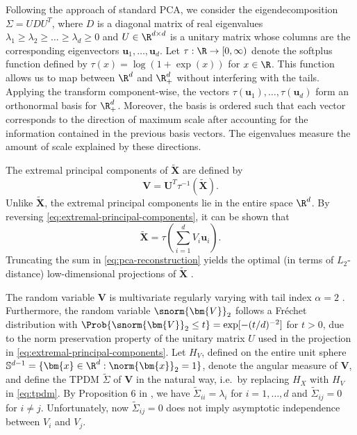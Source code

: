 \documentclass[en-GB, a4paper, nobind]{templates/bathreport}
\begin{document}
Following the approach of standard PCA, we consider the eigendecomposition \(\Sigma=UDU^T\), where \(D\) is a diagonal matrix of real eigenvalues \(\lambda_1\geq\lambda_2\geq\ldots\geq\lambda_d\geq 0\) and \(U\in\R^{d\times d}\) is a unitary matrix whose columns are the corresponding eigenvectors \(\bm{u}_1,\ldots,\bm{u}_d\). Let \(\tau:\R\to[0,\infty)\) denote the softplus function defined by \(\tau(x)=\log(1+\exp(x))\) for \(x\in\R\). This function allows us to map between \(\R^d\) and \(\R_+^d\) without interfering with the tails. Applying the transform component-wise, the vectors \(\tau(\bm{u}_1),\ldots,\tau(\bm{u}_d)\) form an orthonormal basis for \(\R_+^d\). Moreover, the basis is ordered such that each vector corresponds to the direction of maximum scale after accounting for the information contained in the previous basis vectors. The eigenvalues measure the amount of scale explained by these directions.

The extremal principal components of \(\tilde{\bm{X}}\) are defined by
\begin{equation}
\bm{V} = \bm{U}^T\tau^{-1}(\tilde{\bm{X}}).
\label{eq:extremal-principal-components}
\end{equation}
Unlike \(\tilde{\bm{X}}\), the extremal principal components lie in the entire space \(\R^d\). By reversing \eqref{eq:extremal-principal-components}, it can be shown that
\begin{equation}
\tilde{\bm{X}} = \tau\left(\sum_{i=1}^d V_{i}\bm{u}_i\right).
\label{eq:pca-reconstruction}
\end{equation}
Truncating the sum in \eqref{eq:pca-reconstruction} yields the optimal (in terms of \(L_2\)-distance) low-dimensional projections of \(\tilde{\bm{X}}\) \autocite{engelkeSparseStructuresMultivariate2021}.

The random variable \(\bm{V}\) is multivariate regularly varying with tail index \(\alpha=2\) \autocite[Lemma A4]{cooleyDecompositionsDependenceHighdimensional2019}. Furthermore, the random variable \(\snorm{\bm{V}}_2\) follows a Fréchet distribution with \(\Prob{\snorm{\bm{V}}_2\leq t}=\exp[-(t/d)^{-2}]\) for \(t>0\), due to the norm preservation property of the unitary matrix \(U\) used in the projection in \eqref{eq:extremal-principal-components}. Let \(H_V\), defined on the entire unit sphere \(\mathbb{S}^{d-1}=\{\bm{x}\in\R^d:\norm{\bm{x}}_2=1\}\), denote the angular measure of \(\bm{V}\), and define the TPDM \(\tilde{\Sigma}\) of \(\bm{V}\) in the natural way, i.e.~by replacing \(H_X\) with \(H_V\) in \eqref{eq:tpdm}. By Proposition 6 in \textcite{cooleyDecompositionsDependenceHighdimensional2019}, we have \(\tilde{\Sigma}_{ii}=\lambda_i\) for \(i=1,\ldots,d\) and \(\tilde{\Sigma}_{ij}=0\) for \(i\neq j\). Unfortunately, now \(\tilde{\Sigma}_{ij}=0\) does not imply asymptotic independence between \(V_i\) and \(V_j\).
\end{document}
